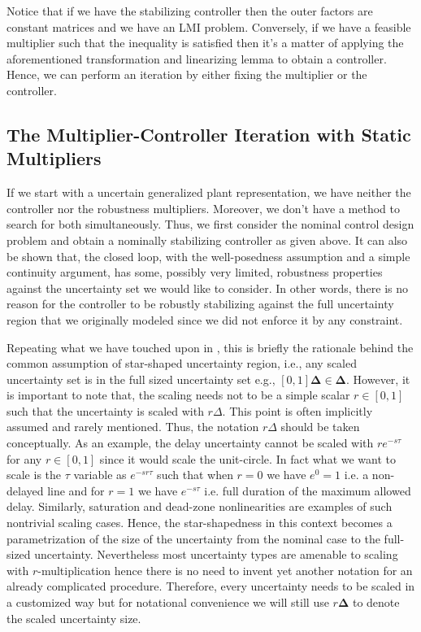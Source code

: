 Notice that if we have the stabilizing controller then the outer factors are constant matrices and we have an LMI problem. Conversely, if 
we have a feasible multiplier such that the inequality is satisfied then it's a matter of applying the aforementioned transformation and 
linearizing lemma to obtain a controller. Hence, we can perform an iteration by either fixing the multiplier or the controller. 

\subsection{The Multiplier-Controller Iteration with Static Multipliers}

If we start with a uncertain generalized plant representation, we have neither the controller nor the robustness multipliers. Moreover, 
we don't have a method to search for both simultaneously. Thus, we first consider the nominal control design problem and obtain a nominally 
stabilizing controller as given above. It can also be shown that, the closed loop, with the well-posedness assumption and a simple 
continuity argument, has some, possibly very limited, robustness properties against the uncertainty set we would like to consider. In 
other words, there is no reason for the controller to be robustly stabilizing against the full uncertainty region that we originally 
modeled since we did not enforce it by any constraint. 

\begin{rem}Repeating what we have touched upon in , this is briefly the rationale behind the common assumption of star-shaped 
uncertainty region, i.e., any scaled uncertainty set is in the full sized uncertainty set e.g., $[0,1]\bm{\Delta}\in\bm{\Delta}$. 
However, it is important to note that, the scaling needs not to be a simple scalar $r\in[0,1]$ such that the uncertainty is scaled with 
$r\Delta$. This point is often implicitly assumed and rarely mentioned. Thus, the notation $r\Delta$ should be taken conceptually. As an 
example, the delay uncertainty cannot be scaled with $re^{-s\tau}$ for any $r\in[0,1]$ since it would scale the unit-circle. In fact what 
we want to scale is the $\tau$ variable as $e^{-sr\tau}$ such that when $r=0$ we have $e^0=1$ i.e. a non-delayed line and for $r=1$ we 
have $e^{-s\tau}$ i.e. full duration of the maximum allowed delay. Similarly, saturation and dead-zone nonlinearities are examples of such 
nontrivial scaling cases. Hence, the star-shapedness in this context becomes a parametrization of the size of the uncertainty from the 
nominal case to the full-sized uncertainty. Nevertheless most uncertainty types are amenable to scaling with $r$-multiplication hence there 
is no need to invent yet another notation for an already complicated procedure. Therefore, every uncertainty needs to be scaled in a 
customized way but for notational convenience we will still use $r\bm{\Delta}$ to denote the scaled uncertainty size. 
\end{rem}


